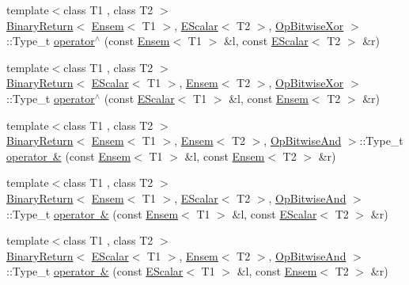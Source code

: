\begin{DoxyCompactItemize}
\item 
{\footnotesize template$<$class T1 , class T2 $>$ }\\\mbox{\hyperlink{structENSEM_1_1BinaryReturn}{Binary\+Return}}$<$ \mbox{\hyperlink{classENSEM_1_1Ensem}{Ensem}}$<$ T1 $>$, \mbox{\hyperlink{classENSEM_1_1EScalar}{E\+Scalar}}$<$ T2 $>$, \mbox{\hyperlink{structENSEM_1_1OpBitwiseXor}{Op\+Bitwise\+Xor}} $>$\+::Type\+\_\+t \mbox{\hyperlink{group__eensem_ga6558c3ffb3c2fcd52505cddbc3c0b310}{operator$^\wedge$}} (const \mbox{\hyperlink{classENSEM_1_1Ensem}{Ensem}}$<$ T1 $>$ \&l, const \mbox{\hyperlink{classENSEM_1_1EScalar}{E\+Scalar}}$<$ T2 $>$ \&r)
\item 
{\footnotesize template$<$class T1 , class T2 $>$ }\\\mbox{\hyperlink{structENSEM_1_1BinaryReturn}{Binary\+Return}}$<$ \mbox{\hyperlink{classENSEM_1_1EScalar}{E\+Scalar}}$<$ T1 $>$, \mbox{\hyperlink{classENSEM_1_1Ensem}{Ensem}}$<$ T2 $>$, \mbox{\hyperlink{structENSEM_1_1OpBitwiseXor}{Op\+Bitwise\+Xor}} $>$\+::Type\+\_\+t \mbox{\hyperlink{group__eensem_gac576149a62d51c7020e2452341351129}{operator$^\wedge$}} (const \mbox{\hyperlink{classENSEM_1_1EScalar}{E\+Scalar}}$<$ T1 $>$ \&l, const \mbox{\hyperlink{classENSEM_1_1Ensem}{Ensem}}$<$ T2 $>$ \&r)
\item 
{\footnotesize template$<$class T1 , class T2 $>$ }\\\mbox{\hyperlink{structENSEM_1_1BinaryReturn}{Binary\+Return}}$<$ \mbox{\hyperlink{classENSEM_1_1Ensem}{Ensem}}$<$ T1 $>$, \mbox{\hyperlink{classENSEM_1_1Ensem}{Ensem}}$<$ T2 $>$, \mbox{\hyperlink{structENSEM_1_1OpBitwiseAnd}{Op\+Bitwise\+And}} $>$\+::Type\+\_\+t \mbox{\hyperlink{group__eensem_gaeb51787a8e99aa2d96b292b6b53160fb}{operator \&}} (const \mbox{\hyperlink{classENSEM_1_1Ensem}{Ensem}}$<$ T1 $>$ \&l, const \mbox{\hyperlink{classENSEM_1_1Ensem}{Ensem}}$<$ T2 $>$ \&r)
\item 
{\footnotesize template$<$class T1 , class T2 $>$ }\\\mbox{\hyperlink{structENSEM_1_1BinaryReturn}{Binary\+Return}}$<$ \mbox{\hyperlink{classENSEM_1_1Ensem}{Ensem}}$<$ T1 $>$, \mbox{\hyperlink{classENSEM_1_1EScalar}{E\+Scalar}}$<$ T2 $>$, \mbox{\hyperlink{structENSEM_1_1OpBitwiseAnd}{Op\+Bitwise\+And}} $>$\+::Type\+\_\+t \mbox{\hyperlink{group__eensem_gadd38c6dbde8cad60658e2a3429480978}{operator \&}} (const \mbox{\hyperlink{classENSEM_1_1Ensem}{Ensem}}$<$ T1 $>$ \&l, const \mbox{\hyperlink{classENSEM_1_1EScalar}{E\+Scalar}}$<$ T2 $>$ \&r)
\item 
{\footnotesize template$<$class T1 , class T2 $>$ }\\\mbox{\hyperlink{structENSEM_1_1BinaryReturn}{Binary\+Return}}$<$ \mbox{\hyperlink{classENSEM_1_1EScalar}{E\+Scalar}}$<$ T1 $>$, \mbox{\hyperlink{classENSEM_1_1Ensem}{Ensem}}$<$ T2 $>$, \mbox{\hyperlink{structENSEM_1_1OpBitwiseAnd}{Op\+Bitwise\+And}} $>$\+::Type\+\_\+t \mbox{\hyperlink{group__eensem_ga81252fa8c928f420f2676e632c49a421}{operator \&}} (const \mbox{\hyperlink{classENSEM_1_1EScalar}{E\+Scalar}}$<$ T1 $>$ \&l, const \mbox{\hyperlink{classENSEM_1_1Ensem}{Ensem}}$<$ T2 $>$ \&r)

\end{DoxyCompactItemize}
